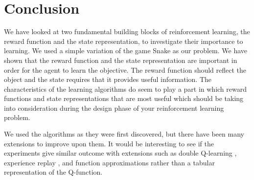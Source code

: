\documentclass[result.tex]{subfiles}
\begin{document}
\section*{\centering Conclusion}

    We have looked at two fundamental building blocks of reinforcement learning, the reward function and the state representation, to investigate their importance to learning. We used a simple variation of the game Snake as our problem. We have shown that the reward function and the state representation are important in order for the agent to learn the objective. The reward function should reflect the object and the state requires that it provides useful information. The characteristics of the learning algorithms do seem to play a part in which reward functions and state representations that are most useful which should be taking into consideration during the design phase of your reinforcement learning problem.

    We used the algorithms as they were first discovered, but there have been many extensions to improve upon them. It would be interesting to see if the experiments give similar outcome with extensions such as double Q-learning \cite{hasselt2010double}, experience replay \cite{lin1992self}, and function approximations rather than a tabular representation of the Q-function.
\end{document}
